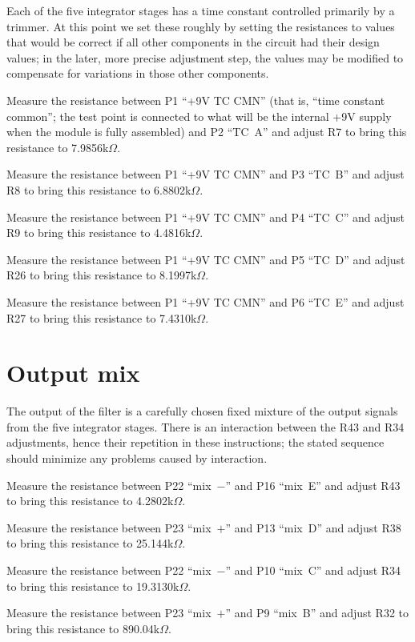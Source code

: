 Each of the five integrator stages has a time constant controlled primarily
by a trimmer.  At this point we set these roughly by setting the resistances
to values that would be correct if all other components in the circuit had
their design values; in the later, more precise adjustment step, the values
may be modified to compensate for variations in those other components.

Measure the resistance between P1 ``+9V TC CMN'' (that is, ``time constant
common''; the test point is connected to what will be the internal +9V
supply when the module is fully assembled) and P2 ``TC~A'' and adjust R7 to
bring this resistance to 7.9856k$\Omega$.

Measure the resistance between P1 ``+9V TC CMN'' and P3 ``TC~B'' and adjust
R8 to bring this resistance to 6.8802k$\Omega$.

Measure the resistance between P1 ``+9V TC CMN'' and P4 ``TC~C'' and adjust
R9 to bring this resistance to 4.4816k$\Omega$.

Measure the resistance between P1 ``+9V TC CMN'' and P5 ``TC~D'' and adjust
R26 to bring this resistance to 8.1997k$\Omega$.

Measure the resistance between P1 ``+9V TC CMN'' and P6 ``TC~E'' and adjust
R27 to bring this resistance to 7.4310k$\Omega$.

\section{Output mix}

The output of the filter is a carefully chosen fixed mixture of the output
signals from the five integrator stages.  There is an interaction between
the R43 and R34 adjustments, hence their repetition in these instructions;
the stated sequence should minimize any problems caused by interaction.

Measure the resistance between P22 ``mix~$-$'' and P16 ``mix~E'' and adjust
R43 to bring this resistance to 4.2802k$\Omega$.

Measure the resistance between P23 ``mix~$+$'' and P13 ``mix~D'' and adjust
R38 to bring this resistance to 25.144k$\Omega$.

Measure the resistance between P22 ``mix~$-$'' and P10 ``mix~C'' and adjust
R34 to bring this resistance to 19.3130k$\Omega$.

Measure the resistance between P23 ``mix~$+$'' and P9 ``mix~B'' and adjust
R32 to bring this resistance to 890.04k$\Omega$.

